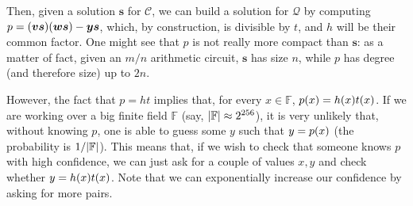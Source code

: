Then, given a solution \(\bm{s}\) for \(\mathcal{C}\), we can build a solution for \(\mathcal{Q}\)
by computing \(p = \Parens*{\bm{v}\bm{s}}\Parens*{\bm{w}\bm{s}} - \bm{y}\bm{s}\), which, by 
construction, is divisible by \(t\), and \(h\) will be their common factor.
One might see that \(p\) is not really more compact than \(\bm{s}\): 
as a matter of fact, given an \(m/n\) arithmetic circuit, \(\bm{s}\) has size \(n\), while 
\(p\) has degree (and therefore size) up to \(2n\).

However, the fact that \(p = ht\) implies that, for every \(x \in \mathbb{F}\), 
\(\call{p}{x} = \call{h}{x}\call{t}{x}\).
If we are working over a big finite field \(\mathbb{F}\) 
(say, \(\left\lvert\mathbb{F}\right\rvert \approx 2^{256}\)), it is very unlikely that, without knowing \(p\), one 
is able to guess some \(y\) such that \(y = \call{p}{x}\) 
(the probability is \(1/{\left\lvert\mathbb{F}\right\rvert}\)).
This means that, if we wish to check that someone knows \(p\) with high confidence, we can just 
ask for a couple of values \(x, y\) and check whether \(y = \call{h}{x}\call{t}{x}\).
Note that we can exponentially increase our confidence by asking for more pairs.
